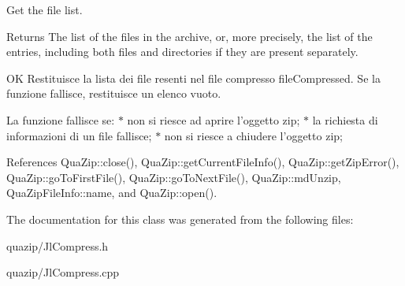 Get the file list. 

\begin{DoxyReturn}{Returns}
The list of the files in the archive, or, more precisely, the list of the entries, including both files and directories if they are present separately.
\end{DoxyReturn}
OK Restituisce la lista dei file resenti nel file compresso fileCompressed. Se la funzione fallisce, restituisce un elenco vuoto.

La funzione fallisce se: $\ast$ non si riesce ad aprire l'oggetto zip; $\ast$ la richiesta di informazioni di un file fallisce; $\ast$ non si riesce a chiudere l'oggetto zip; 

References QuaZip::close(), QuaZip::getCurrentFileInfo(), QuaZip::getZipError(), QuaZip::goToFirstFile(), QuaZip::goToNextFile(), QuaZip::mdUnzip, QuaZipFileInfo::name, and QuaZip::open().



The documentation for this class was generated from the following files:\begin{DoxyCompactItemize}
\item 
quazip/JlCompress.h\item 
quazip/JlCompress.cpp\end{DoxyCompactItemize}
